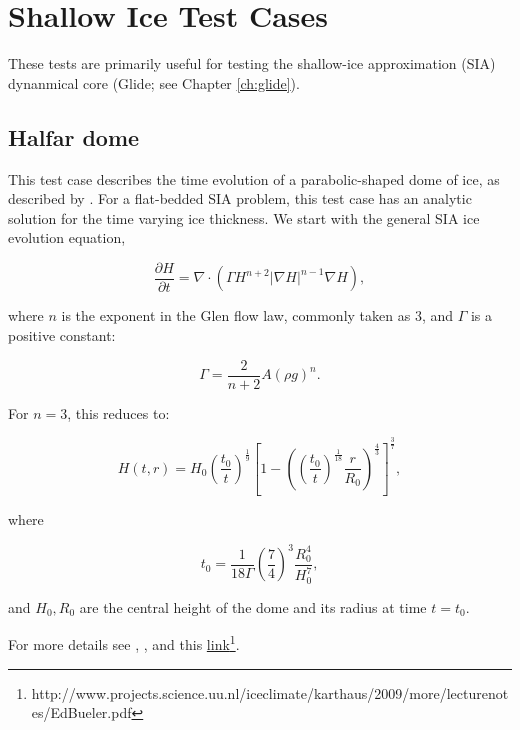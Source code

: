
\section{Shallow Ice Test Cases}
\label{sc:sia-tests}

These tests are primarily useful for testing the shallow-ice approximation (SIA) dynanmical core (Glide; see Chapter \ref{ch:glide}).

\subsection{Halfar dome}

\label{sec:halfar_description}
This test case describes the time evolution of a parabolic-shaped dome of ice, as described by \citet{Halfar1983}.
For a flat-bedded SIA problem, this test case has an analytic solution for the time varying ice thickness. We start with the
general SIA ice evolution equation,  

\begin{equation}
    \label{halfar}
    \frac{\partial H}{\partial t} = \nabla \cdot (\Gamma H^{n+2} |\nabla H|^{n-1} \nabla H),
\end{equation}

where $n$ is the exponent in the Glen flow law, commonly taken as 3, and $\Gamma$ is a positive constant:

\begin{equation}
    \Gamma = \frac{2}{n+2} A (\rho g)^n.
\end{equation}

For $n=3$, this reduces to:

\begin{equation}
    H(t,r) = H_0 \left(\frac{t_0}{t}\right)^\frac{1}{9}  \left[ 1 - \left(  \left( \frac{t_0}{t} \right) ^ \frac{1}{18} \frac{r}{R_0} \right)^\frac{4}{3} \right] ^ \frac{3}{7},
\end{equation}

where

\begin{equation}
    t_0 = \frac{1}{18\Gamma} \left( \frac{7}{4} \right)^3 \frac{R_0^4}{H_0^7},
\end{equation}

and $H_0, R_0$ are the central height of the dome and its radius at time $t=t_0$.

For more details see \citet{Halfar1983}, \citet{Bueler2005}, and this \href{http://www.projects.science.uu.nl/iceclimate/karthaus/2009/more/lecturenotes/EdBueler.pdf}{link}\footnote{http://www.projects.science.uu.nl/iceclimate/karthaus/2009/more/lecturenotes/EdBueler.pdf}.

